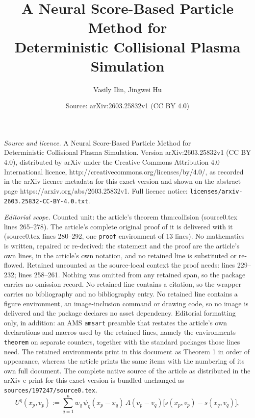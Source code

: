 \documentclass[10pt,a4paper]{amsart}
\title{A Neural Score-Based Particle Method for \\ Deterministic Collisional Plasma Simulation}
\author{Vasily Ilin, Jingwei Hu}
\date{Source: arXiv:2603.25832v1 (CC BY 4.0)}
\begin{document}
\maketitle

\noindent\emph{Source and licence.} A Neural Score-Based Particle Method for \\ Deterministic Collisional Plasma Simulation. Version arXiv:2603.25832v1 (CC BY 4.0), distributed by arXiv under the Creative Commons Attribution 4.0 International licence, http://creativecommons.org/licenses/by/4.0/, as recorded in the arXiv licence metadata for this exact version and shown on the abstract page https://arxiv.org/abs/2603.25832v1. Full licence notice: \texttt{licenses/arxiv-2603.25832-CC-BY-4.0.txt}.\par\smallskip

\noindent\textit{Editorial scope.} Counted unit: the article's theorem thm:collision (source0.tex lines 265--278). The article's complete original proof of it is delivered with it (source0.tex lines 280--292, one \texttt{proof} environment of 13 lines). No mathematics is written, repaired or re-derived: the statement and the proof are the article's own lines, in the article's own notation, and no retained line is substituted or re-flowed.  Retained uncounted as the source-local context the proof needs: lines 229--232; lines 258--261.  Nothing was omitted from any retained span, so the package carries no omission record.  No retained line contains a citation, so the wrapper carries no bibliography and no bibliography entry.  No retained line contains a figure environment, an image-inclusion command or drawing code, so no image is delivered and the package declares no asset dependency.  Editorial formatting only, in addition: an AMS \texttt{amsart} preamble that restates the article's own declarations and macros used by the retained lines, namely the environments \texttt{theorem} on separate counters, together with the standard packages those lines need.  The retained environments print in this document as Theorem 1 in order of appearance, whereas the article prints the same items with the numbering of its own full document.  The complete native source of the article as distributed in the arXiv e-print for this exact version is bundled unchanged as \texttt{sources/197247/source0.tex}.
\begin{equation}
\label{eq:Landau_particle}
U^{\eta}(x_p,v_p):=\sum_{q=1}^{n} w_q \, \psi_\eta(x_p - x_q) \, A(v_p - v_q) \big[ s(x_p, v_p) - s(x_q, v_q) \big],
\end{equation}
\end{document}
